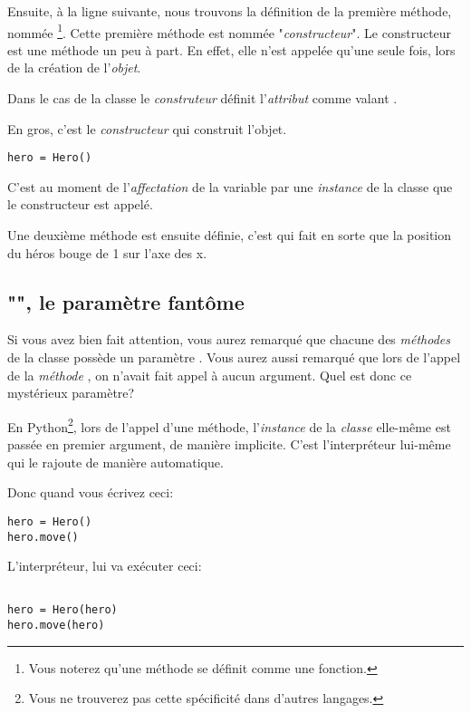 Ensuite, à la ligne suivante, nous trouvons la définition de la première méthode, nommée \footnote{Vous noterez qu'une méthode se définit comme une fonction.}. Cette première méthode est nommée "\emph{constructeur}".
Le constructeur est une méthode un peu à part. En effet, elle n'est appelée qu'une seule fois, lors de la création de l'\emph{objet}.

Dans le cas de la classe  le \emph{construteur} définit l'\emph{attribut}  comme valant .

En gros, c'est le \emph{constructeur} qui construit l'objet.

\begin{lstlisting}
hero = Hero()
\end{lstlisting}

C'est au moment de l'\emph{affectation} de la variable  par une \emph{instance} de la classe  que le constructeur est appelé.

Une deuxième méthode est ensuite définie, c'est  qui fait en sorte que la position du héros bouge de 1 sur l'axe des x.


\subsection{"", le paramètre fantôme}

Si vous avez bien fait attention, vous aurez remarqué que chacune des \emph{méthodes} de la classe  possède un paramètre . Vous aurez aussi remarqué que lors de l'appel de la \emph{méthode} , on n'avait fait appel à aucun argument. Quel est donc ce mystérieux paramètre?

En Python\footnote{Vous ne trouverez pas cette spécificité dans d'autres langages.}, lors de l'appel d'une méthode, l'\emph{instance} de la \emph{classe} elle-même est passée en premier argument, de manière implicite. C'est l'interpréteur lui-même qui le rajoute de manière automatique.

Donc quand vous écrivez ceci:
\begin{lstlisting}
hero = Hero()
hero.move()
\end{lstlisting}

L'interpréteur, lui va exécuter ceci:

\begin{lstlisting}

hero = Hero(hero)
hero.move(hero)

\end{lstlisting}

